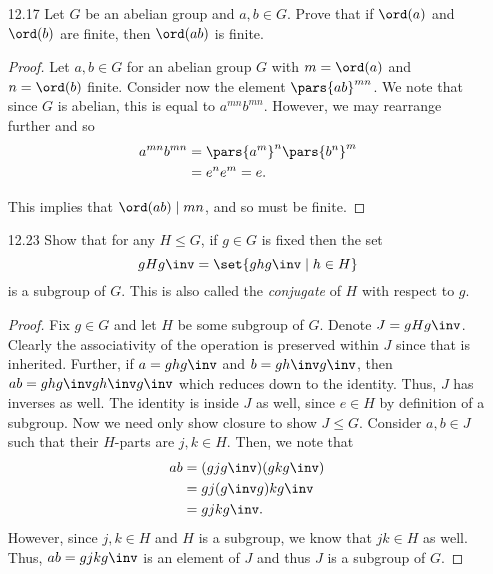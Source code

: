 \documentclass{article}
\begin{document}
\begin{enumerate}
  \item[12.17\rparen] Let $G$ be an abelian group and $a, b \in G$.
        Prove that if $\ord(a)$ and $\ord(b)$ are finite, then $\ord(ab)$ is finite.

        \begin{proof}
          Let $a, b \in G$ for an abelian group $G$ with $m = \ord(a)$ and $n = \ord(b)$ finite.
          Consider now the element $\pars{ab}^{mn}$.
          We note that since $G$ is abelian, this is equal to $a^{mn}b^{mn}$.
          However, we may rearrange further and so
          \begin{align*}
            a^{mn}b^{mn} &= \pars{a^{m}}^{n}\pars{b^{n}}^{m}\\
            &= e^{n}e^{m} = e.
          \end{align*}

          This implies that $\ord(ab) \mid mn$, and so must be finite.
        \end{proof}

  \item[12.23\rparen] Show that for any $H \le G$, if $g \in G$ is fixed then the set
        \[ gHg\inv = \set{ ghg\inv \mid h \in H } \]
        is a subgroup of $G$.
        This is also called the \emph{conjugate} of $H$ with respect to $g$.
        \begin{proof}
          Fix $g \in G$ and let $H$ be some subgroup of $G$.
          Denote $J = gHg\inv$.
          Clearly the associativity of the operation is preserved within $J$ since that is inherited.
          Further, if $a = ghg\inv$ and $b = gh\inv g\inv$, then $ab = ghg\inv g h\inv g\inv$
          which reduces down to the identity. Thus, $J$ has inverses as well.
          The identity is inside $J$ as well, since $e \in H$ by definition of a subgroup.
          Now we need only show closure to show $J \le G$.
          Consider $a, b \in J$ such that their $H$-parts are $j, k \in H$.
          Then, we note that
          \begin{align*}
            ab &= (gjg\inv)(gkg\inv)\\
            &= gj(g\inv g)kg\inv\\
            &= gjkg\inv.
          \end{align*}
          However, since $j, k \in H$ and $H$ is a subgroup, we know that $jk \in H$ as well.
          Thus, $ab = gjkg\inv$ is an element of $J$ and thus $J$ is a subgroup of $G$.
        \end{proof}


\end{enumerate}
\end{document}
